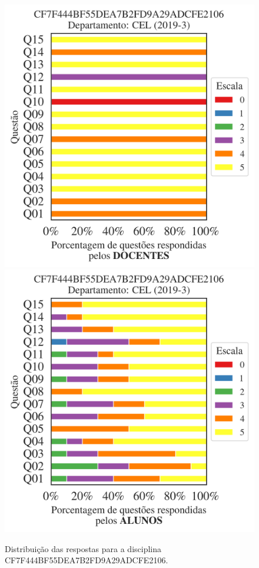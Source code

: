 \documentclass[a4paper,10pt]{article}
\begin{document}
\begin{figure}[h]
\centering
\includegraphics[width=0.485\linewidth]{analise_disciplina_departamento_CEL_CF7F444BF55DEA7B2FD9A29ADCFE2106_docentes.png}
\includegraphics[width=0.485\linewidth]{analise_disciplina_departamento_CEL_CF7F444BF55DEA7B2FD9A29ADCFE2106_alunos.png}
\caption{\label{fig:analise_geral_departamento}                Distribuição das respostas para a disciplina CF7F444BF55DEA7B2FD9A29ADCFE2106. }
\end{figure}
\end{document}
